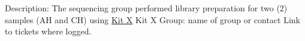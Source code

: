 \markdownRendererUlBegin
\markdownRendererUlItem Description: The sequencing group performed library preparation for two (2) samples (AH and CH) using \href{https://www.sophiagenetics.com/clinical/oncology/solid-tumors/}{Kit X} Kit X\markdownRendererUlItemEnd 
\markdownRendererUlItem Group: name of group or contact\markdownRendererUlItemEnd 
\markdownRendererUlItem Link to tickets where logged.\markdownRendererUlItemEnd 
\markdownRendererUlEnd \relax